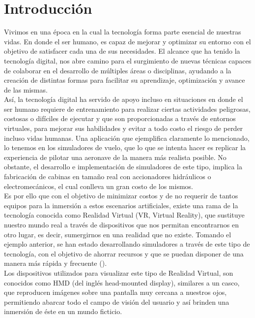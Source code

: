 \documentclass[a4paper,openright,12pt]{report}
\begin{document}
\chapter{Introducción}\label{cap.introduccion}
\pagestyle{fancy}
Vivimos en una época en la cual la tecnología forma parte esencial de nuestras vidas. En donde el ser humano, es capaz de mejorar y optimizar su entorno con el objetivo de satisfacer cada una de sus necesidades. El alcance que ha tenido la tecnología digital, nos abre camino para el surgimiento de nuevas técnicas capaces de colaborar en el desarrollo de múltiples áreas o disciplinas, ayudando a la creación de distintas formas para facilitar su aprendizaje, optimización y avance de las mismas.\\
Así, la tecnología digital ha servido de apoyo incluso en situaciones en donde el ser humano requiere de entrenamiento para realizar ciertas actividades peligrosas, costosas o difíciles de ejecutar y que son proporcionadas a través de entornos virtuales, para mejorar sus habilidades y evitar a todo costo el riesgo de perder incluso vidas humanas. Una aplicación que ejemplifica claramente lo mencionado, lo tenemos en los simuladores de vuelo, que lo que se intenta hacer es replicar la experiencia de pilotar una aeronave de la manera más realista posible. No obstante, el desarrollo e implementación de simuladores de este tipo, implica la fabricación de cabinas en tamaño real con accionadores hidráulicos o electromecánicos, el cual conlleva un gran costo de los mismos.\\
Es por ello que con el objetivo de minimizar costos y de no requerir de tantos equipos para la inmersión a estos escenarios artificiales, existe una rama de la tecnología conocida como Realidad Virtual (VR, Virtual Reality), que sustituye nuestro mundo real a través de dispositivos que nos permitan encontrarnos en otro lugar, es decir, sumergirnos en una realidad que no existe. Tomando el ejemplo anterior, se han estado desarrollando simuladores a través de este tipo de tecnología, con el objetivo de ahorrar recursos y que se puedan disponer de una manera más rápida y frecuente (\cite{Pausch1992,allerton2010}).\\
Los dispositivos utilizados para visualizar este tipo de Realidad Virtual, son conocidos como HMD (del inglés head-mounted display), similares a un casco, que reproducen imágenes sobre una pantalla muy cercana a nuestros ojos, permitiendo abarcar todo el campo de visión del usuario y así brinden una inmersión de éste en un mundo ficticio.\\
\end{document}
